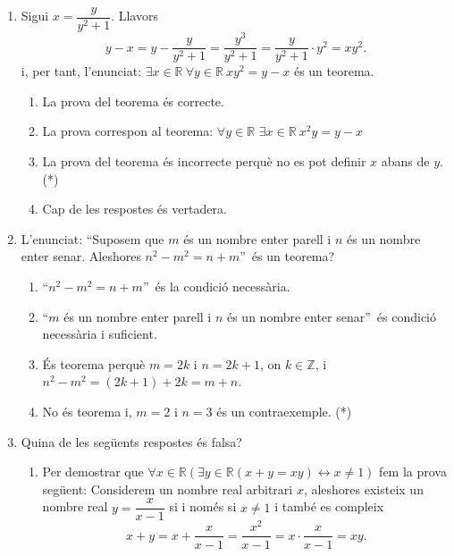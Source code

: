\begin{enumerate}
\item Sigui $x=\dfrac{y}{y^{2}+1}$. Llavors
\[
y-x=y-\dfrac{y}{y^{2}+1}=\dfrac{y^{3}}{y^{2}+1}=\dfrac{y}{y^{2}+1}\cdot
y^{2}=xy^{2}\text{.}%
\]
i, per tant, l'enunciat: $\exists x\in\mathbb{R~}\forall y\in\mathbb{R~}%
xy^{2}=y-x$ \'{e}s un teorema.

\begin{enumerate}
\item La prova del teorema \'{e}s correcte.

\item La prova correspon al teorema: $\forall y\in\mathbb{R}$ $\exists
x\in\mathbb{R~}x^{2}y=y-x$

\item La prova del teorema \'{e}s incorrecte perqu\`{e} no es pot definir $x$
abans de $y$. (*)

\item Cap de les respostes \'{e}s vertadera.
\end{enumerate}

\item L'enunciat: \textquotedblleft Suposem que $m$ \'{e}s un nombre enter
parell i $n$ \'{e}s un nombre enter senar. Aleshores $n^{2}-m^{2}%
=n+m$\textquotedblright\ \'{e}s un teorema?

\begin{enumerate}
\item \textquotedblleft$n^{2}-m^{2}=n+m$\textquotedblright\ \'{e}s la
condici\'{o} necess\`{a}ria.

\item \textquotedblleft$m$ \'{e}s un nombre enter parell i $n$ \'{e}s un
nombre enter senar\textquotedblright\ \'{e}s condici\'{o} necess\`{a}ria i suficient.

\item \'{E}s teorema perqu\`{e} $m=2k$ i $n=2k+1$, on $k\in\mathbb{Z}$, i
$n^{2}-m^{2}=\left(  2k+1\right)  +2k=m+n$.

\item No \'{e}s teorema i, $m=2$ i $n=3$ \'{e}s un contraexemple. (*)
\end{enumerate}

\item Quina de les seg\"{u}ents respostes \'{e}s falsa?

\begin{enumerate}
\item Per demostrar que $\forall x\in\mathbb{R}\left(  \exists y\in
\mathbb{R}(x+y=xy)\leftrightarrow x\neq1\right)  $ fem la prova seg\"{u}ent:
Considerem un nombre real arbitrari $x$, aleshores existeix un nombre real
$y=\dfrac{x}{x-1}$ si i nom\'{e}s si $x\neq1$ i tamb\'{e} es compleix%
\[
x+y=x+\dfrac{x}{x-1}=\frac{x^{2}}{x-1}=x\cdot\frac{x}{x-1}=xy\text{.}%
\]



\end{enumerate}
\end{enumerate}
